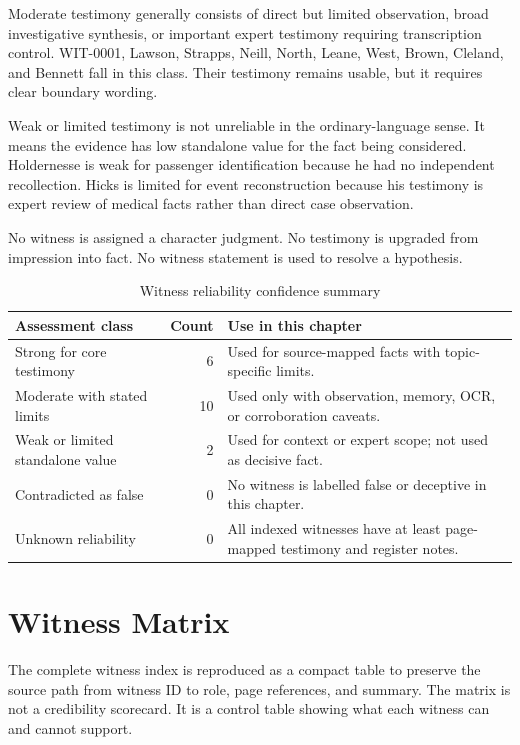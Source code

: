 Moderate testimony generally consists of direct but limited observation, broad investigative synthesis, or important expert testimony requiring transcription control. WIT-0001, Lawson, Strapps, Neill, North, Leane, West, Brown, Cleland, and Bennett fall in this class. Their testimony remains usable, but it requires clear boundary wording.

Weak or limited testimony is not unreliable in the ordinary-language sense. It means the evidence has low standalone value for the fact being considered. Holdernesse is weak for passenger identification because he had no independent recollection. Hicks is limited for event reconstruction because his testimony is expert review of medical facts rather than direct case observation.

No witness is assigned a character judgment. No testimony is upgraded from impression into fact. No witness statement is used to resolve a hypothesis.

\begin{table}[htbp]
\centering
\caption{Witness reliability confidence summary}
\label{tab:witness-confidence-summary}
\begin{tabularx}{\textwidth}{>{\raggedright\arraybackslash}p{}r>{\raggedright\arraybackslash}X}
\toprule
Assessment class & Count & Use in this chapter \\
\midrule
Strong for core testimony & 6 & Used for source-mapped facts with topic-specific limits. \\
Moderate with stated limits & 10 & Used only with observation, memory, OCR, or corroboration caveats. \\
Weak or limited standalone value & 2 & Used for context or expert scope; not used as decisive fact. \\
Contradicted as false & 0 & No witness is labelled false or deceptive in this chapter. \\
Unknown reliability & 0 & All indexed witnesses have at least page-mapped testimony and register notes. \\
\bottomrule
\end{tabularx}
\end{table}

\section{Witness Matrix}

The complete witness index is reproduced as a compact table to preserve the source path from witness ID to role, page references, and summary. The matrix is not a credibility scorecard. It is a control table showing what each witness can and cannot support.

